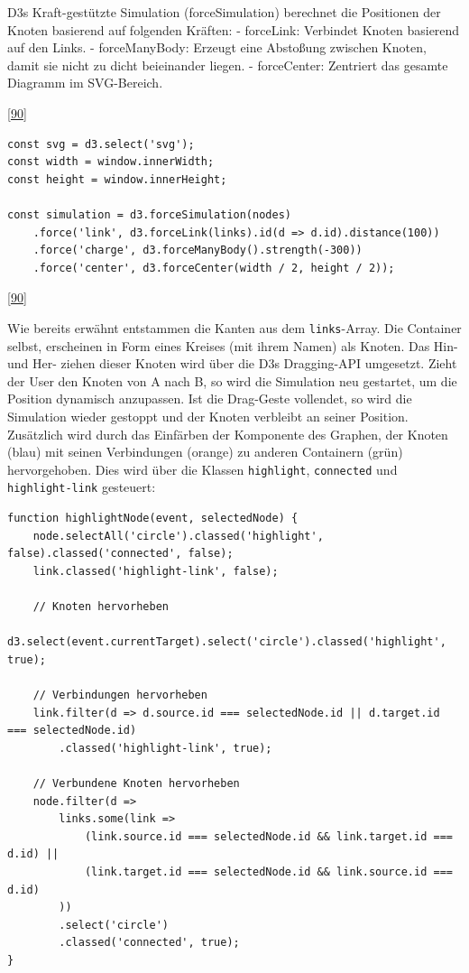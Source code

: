 \documentclass[
    headings=optiontotocandhead,%
    twoside,
    numbers=noenddot,%
    12pt, %
    titlepage, %
    parskip=full, %
    listof=leveldown, 
    numbers=noenddot, %
    a4paper,DIV=14,
    BCOR=15mm,
]{scrbook}
\newcommand{\passthrough}[1]{#1}
\renewenvironment{quote}{\begin{customblockquote}\list{}{\rightmargin=0em\leftmargin=0em}%
\item\relax\color{blockquote-text}\ignorespaces}{\unskip\unskip\endlist\end{customblockquote}}
\begin{document}
\begin{quote}
D3s Kraft-gestützte Simulation (forceSimulation) berechnet die
Positionen der Knoten basierend auf folgenden Kräften: - forceLink:
Verbindet Knoten basierend auf den Links. - forceManyBody: Erzeugt eine
Abstoßung zwischen Knoten, damit sie nicht zu dicht beieinander liegen.
- forceCenter: Zentriert das gesamte Diagramm im SVG-Bereich.
\end{quote}

{[}\protect\hyperlink{ref-gpt-D3jsDGScript}{90}{]}

\begin{lstlisting}[caption={Verwendung eines svg-Elements um den Graphen zu rendern}]
const svg = d3.select('svg');
const width = window.innerWidth;
const height = window.innerHeight;

const simulation = d3.forceSimulation(nodes)
    .force('link', d3.forceLink(links).id(d => d.id).distance(100))
    .force('charge', d3.forceManyBody().strength(-300))
    .force('center', d3.forceCenter(width / 2, height / 2));
\end{lstlisting}

{[}\protect\hyperlink{ref-gpt-D3jsDGScript}{90}{]}

Wie bereits erwähnt entstammen die Kanten aus dem
\passthrough{\lstinline!links!}-Array. Die Container selbst, erscheinen
in Form eines Kreises (mit ihrem Namen) als Knoten. Das Hin- und Her-
ziehen dieser Knoten wird über die D3s Dragging-API umgesetzt. Zieht der
User den Knoten von A nach B, so wird die Simulation neu gestartet, um
die Position dynamisch anzupassen. Ist die Drag-Geste vollendet, so wird
die Simulation wieder gestoppt und der Knoten verbleibt an seiner
Position. Zusätzlich wird durch das Einfärben der Komponente des
Graphen, der Knoten (blau) mit seinen Verbindungen (orange) zu anderen
Containern (grün) hervorgehoben. Dies wird über die Klassen
\passthrough{\lstinline!highlight!}, \passthrough{\lstinline!connected!}
und \passthrough{\lstinline!highlight-link!} gesteuert:

\begin{lstlisting}[caption={Farbsteuerung des Graphen}]
function highlightNode(event, selectedNode) {
    node.selectAll('circle').classed('highlight', false).classed('connected', false);
    link.classed('highlight-link', false);

    // Knoten hervorheben
    d3.select(event.currentTarget).select('circle').classed('highlight', true);

    // Verbindungen hervorheben
    link.filter(d => d.source.id === selectedNode.id || d.target.id === selectedNode.id)
        .classed('highlight-link', true);

    // Verbundene Knoten hervorheben
    node.filter(d =>
        links.some(link =>
            (link.source.id === selectedNode.id && link.target.id === d.id) ||
            (link.target.id === selectedNode.id && link.source.id === d.id)
        ))
        .select('circle')
        .classed('connected', true);
}
\end{lstlisting}
\end{document}

